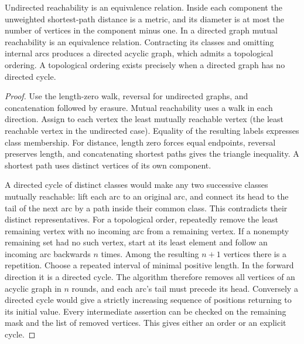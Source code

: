 \begin{corollary}\leavevmode\label{stcond}
Undirected reachability is an equivalence relation. Inside each component the unweighted shortest-path distance is a metric, and its diameter is at most the number of vertices in the component minus one. In a directed graph mutual reachability is an equivalence relation. Contracting its classes and omitting internal arcs produces a directed acyclic graph, which admits a topological ordering. A topological ordering exists precisely when a directed graph has no directed cycle.
\end{corollary}
\begin{proof}
Use the length-zero walk, reversal for undirected graphs, and concatenation followed by erasure. Mutual reachability uses a walk in each direction. Assign to each vertex the least mutually reachable vertex (the least reachable vertex in the undirected case). Equality of the resulting labels expresses class membership. For distance, length zero forces equal endpoints, reversal preserves length, and concatenating shortest paths gives the triangle inequality. A shortest path uses distinct vertices of its own component.

A directed cycle of distinct classes would make any two successive classes mutually reachable: lift each arc to an original arc, and connect its head to the tail of the next arc by a path inside their common class. This contradicts their distinct representatives. For a topological order, repeatedly remove the least remaining vertex with no incoming arc from a remaining vertex. If a nonempty remaining set had no such vertex, start at its least element and follow an incoming arc backwards $n$ times. Among the resulting $n+1$ vertices there is a repetition. Choose a repeated interval of minimal positive length. In the forward direction it is a directed cycle. The algorithm therefore removes all vertices of an acyclic graph in $n$ rounds, and each arc's tail must precede its head. Conversely a directed cycle would give a strictly increasing sequence of positions returning to its initial value. Every intermediate assertion can be checked on the remaining mask and the list of removed vertices. This gives either an order or an explicit cycle.
\end{proof}

